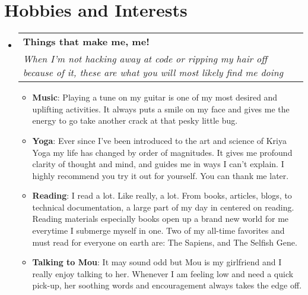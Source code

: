 \documentclass[letterpaper,11pt]{article}
\makeatletter
\newcommand{\resumeItem}[2]{
  \item\small{
    \textbf{#1}{: #2 \vspace{-2pt}}
  }
}
\newcommand{\resumeSubheading}[4]{
  \vspace{-1pt}\item
    \begin{tabular*}{0.97\textwidth}{l@{\extracolsep{\fill}}r}
      \textbf{#1} & #2 \\
      \textit{\small#3} & \textit{\small #4} \\
    \end{tabular*}\vspace{-5pt}
}
\newcommand{\resumeSubHeadingListStart}{\begin{itemize}[leftmargin=*]}
\newcommand{\resumeSubHeadingListEnd}{\end{itemize}}
\newcommand{\resumeItemListStart}{\begin{itemize}}
\newcommand{\resumeItemListEnd}{\end{itemize}\vspace{-5pt}}
\makeatother
\begin{document}
\section{Hobbies and Interests}
  \resumeSubHeadingListStart
      \resumeSubheading
      {Things that make me, me!}{}
      {When I'm not hacking away at code or ripping my hair off because of it, these are what you will most likely find me doing}{}
      \resumeItemListStart
      	\resumeItem{Music}{Playing a tune on my guitar is one of my most desired and uplifting activities. It always puts a smile on my face and gives me the energy to go take another crack at that pesky little bug.}
      	\resumeItem{Yoga}{Ever since I've been introduced to the art and science of Kriya Yoga my life has changed by order of magnitudes. It gives me profound clarity of thought and mind, and guides me in ways I can't explain. I highly recommend you try it out for yourself. You can thank me later.}
      	\resumeItem{Reading}{I read a lot. Like really, a lot. From books, articles, blogs, to technical documentation, a large part of my day in centered on reading. Reading materials especially books open up a brand new world for me everytime I submerge myself in one. Two of my all-time favorites and must read for everyone on earth are: The Sapiens, and The Selfish Gene.}      	
      	\resumeItem{Talking to Mou}{It may sound odd but Mou is my girlfriend and I really enjoy talking to her. Whenever I am feeling low and need a quick pick-up, her soothing words and encouragement always takes the edge off.}      	
      \resumeItemListEnd    
 \resumeSubHeadingListEnd
\end{document}

